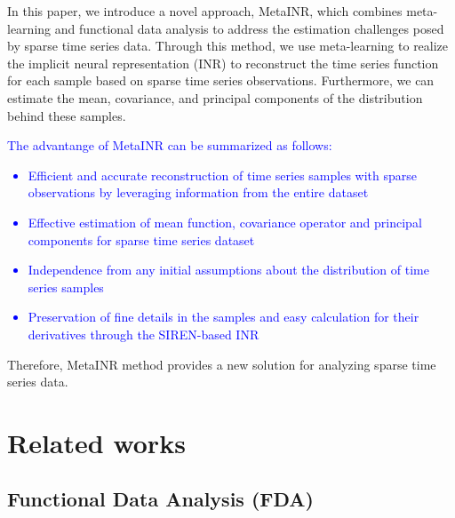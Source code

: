\documentclass{article}
\begin{document}
In this paper, we introduce a novel approach, MetaINR, which combines meta-learning and functional data analysis to address the estimation challenges posed by sparse time series data. 
Through this method, we use meta-learning to realize the implicit neural representation (INR) to
reconstruct the time series function for each sample based on sparse time series observations.
Furthermore, we can estimate the mean, covariance, and principal components of the distribution behind these samples.
\textcolor{blue}{
  The advantange of MetaINR can be summarized as follows:
  \begin{itemize}
    \item Efficient and accurate reconstruction of time series samples with sparse observations by leveraging information from the entire dataset
    \item Effective estimation of mean function, covariance operator and principal components for sparse time series dataset
    \item Independence from any initial assumptions about the distribution of time series samples
    \item Preservation of fine details in the samples and easy calculation for their derivatives through the SIREN-based INR
  \end{itemize}
}

Therefore, MetaINR method provides a new solution for analyzing sparse time series data.


\section{Related works}

\subsection{Functional Data Analysis (FDA)}
\end{document}

